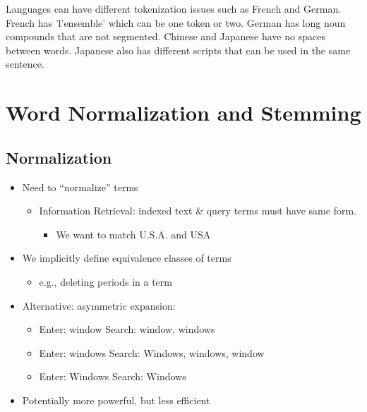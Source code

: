 \documentclass[11pt]{article}
\theoremstyle{definition}
\begin{document}
Languages can have different tokenization issues such as French and German. 
French has 'l'ensemble' which can be one token or two. German has long noun compounds that are not segmented.
Chinese and Japanese have no spaces between words.
Japanese also has different scripts that can be used in the same sentence.

\section{Word Normalization and
Stemming}
\subsection{Normalization}
\begin{itemize}
  \item Need to “normalize” terms
  \begin{itemize}
    \item Information Retrieval: indexed text \& query terms must have same form.
    \begin{itemize}
      \item We want to match U.S.A. and USA
    \end{itemize}
  \end{itemize}
  \item We implicitly define equivalence classes of terms
  \begin{itemize}
    \item e.g., deleting periods in a term
  \end{itemize}
  \item Alternative: asymmetric expansion:
  \begin{itemize}
    \item Enter: window       Search: window, windows
    \item Enter: windows      Search: Windows, windows, window
    \item Enter: Windows      Search: Windows
  \end{itemize}
  \item Potentially more powerful, but less efficient
\end{itemize}
\end{document}
